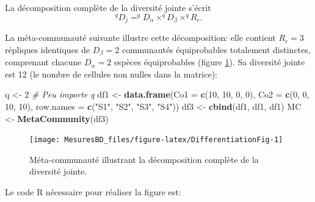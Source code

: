 \documentclass[
  11pt,
  french,
  a4paper,
  extrafontsizes,onecolumn,openright
  ]{memoir}
\newenvironment{Shaded}{\begin{snugshade}}{\end{snugshade}}
\newcommand{\AttributeTok}[1]{\textcolor[rgb]{0.13,0.29,0.53}{#1}}
\newcommand{\CommentTok}[1]{\textcolor[rgb]{0.56,0.35,0.01}{\textit{#1}}}
\newcommand{\DecValTok}[1]{\textcolor[rgb]{0.00,0.00,0.81}{#1}}
\newcommand{\FunctionTok}[1]{\textcolor[rgb]{0.13,0.29,0.53}{\textbf{#1}}}
\newcommand{\NormalTok}[1]{#1}
\newcommand{\OtherTok}[1]{\textcolor[rgb]{0.56,0.35,0.01}{#1}}
\newcommand{\StringTok}[1]{\textcolor[rgb]{0.31,0.60,0.02}{#1}}
\begin{document}
La décomposition complète de la diversité jointe s'écrit
\begin{equation}
  \label{eq:DecJointe}
  ^{q}\!D_{j}= ^{q}\!D_{\alpha} \times ^{q}\!D_{\beta} \times ^{q}\!R_{c}.
\end{equation}

La méta-communauté suivante illustre cette décomposition: elle contient \(R_c=3\) répliques identiques de \(D_{\beta}=2\) communautés équiprobables totalement distinctes, comprenant chacune \(D_{\alpha}=2\) espèces équiprobables (figure \ref{fig:DifferentiationFig}).
Sa diversité jointe est 12 (le nombre de cellules non nulles dans la matrice):

\scriptsize

\begin{Shaded}
\begin{Highlighting}[]
\NormalTok{q }\OtherTok{\textless{}{-}} \DecValTok{2}  \CommentTok{\# Peu importe q}
\NormalTok{df1 }\OtherTok{\textless{}{-}} \FunctionTok{data.frame}\NormalTok{(}\AttributeTok{Co1 =} \FunctionTok{c}\NormalTok{(}\DecValTok{10}\NormalTok{, }\DecValTok{10}\NormalTok{, }\DecValTok{0}\NormalTok{, }\DecValTok{0}\NormalTok{), }\AttributeTok{Co2 =} \FunctionTok{c}\NormalTok{(}\DecValTok{0}\NormalTok{, }\DecValTok{0}\NormalTok{, }\DecValTok{10}\NormalTok{, }\DecValTok{10}\NormalTok{),}
    \AttributeTok{row.names =} \FunctionTok{c}\NormalTok{(}\StringTok{"S1"}\NormalTok{, }\StringTok{"S2"}\NormalTok{, }\StringTok{"S3"}\NormalTok{, }\StringTok{"S4"}\NormalTok{))}
\NormalTok{df3 }\OtherTok{\textless{}{-}} \FunctionTok{cbind}\NormalTok{(df1, df1, df1)}
\NormalTok{MC }\OtherTok{\textless{}{-}} \FunctionTok{MetaCommunity}\NormalTok{(df3)}
\end{Highlighting}
\end{Shaded}

\normalsize

\scriptsize

\begin{figure}

{\centering \texttt{[image: MesuresBD\_files/figure-latex/DifferentiationFig-1]} 

}

\caption{Méta-communauté illustrant la décomposition complète de la diversité jointe.}\label{fig:DifferentiationFig}
\end{figure}

\normalsize

Le code R nécessaire pour réaliser la figure est:

\scriptsize
\end{document}
